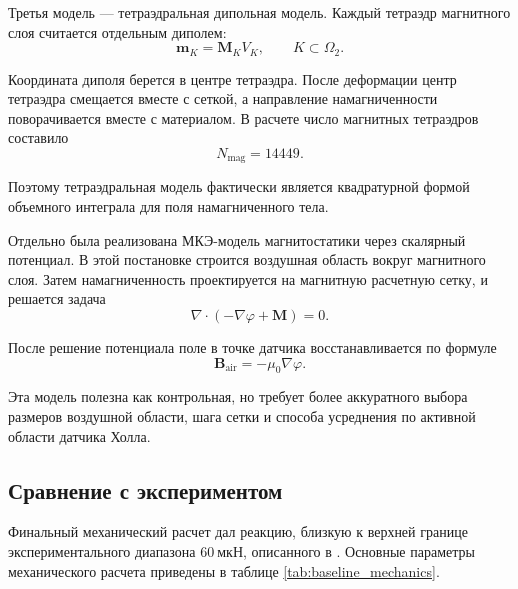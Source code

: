 \documentclass[14pt,a4paper]{extarticle}
\begin{document}
Третья модель --- тетраэдральная дипольная модель. Каждый тетраэдр магнитного слоя считается отдельным диполем:
\begin{equation}
    \mathbf{m}_K
    =
    \mathbf{M}_K V_K,
    \qquad
    K\subset\Omega_2.
\end{equation}

Координата диполя берется в центре тетраэдра. После деформации центр тетраэдра смещается вместе с сеткой, а направление намагниченности поворачивается вместе с материалом. В расчете число магнитных тетраэдров составило
\begin{equation}
    N_{\mathrm{mag}}=14449.
\end{equation}

Поэтому тетраэдральная модель фактически является квадратурной формой объемного интеграла для поля намагниченного тела.

Отдельно была реализована МКЭ-модель магнитостатики через скалярный потенциал. В этой постановке строится воздушная область вокруг магнитного слоя. Затем намагниченность проектируется на магнитную расчетную сетку, и решается задача
\begin{equation}
    \nabla\cdot(-\nabla\varphi+\mathbf{M})=0.
\end{equation}

После решение потенциала поле в точке датчика восстанавливается по формуле
\begin{equation}
    \mathbf{B}_{\mathrm{air}}
    =
    -\mu_0\nabla\varphi.
\end{equation}

Эта модель полезна как контрольная, но требует более аккуратного выбора размеров воздушной области, шага сетки и способа усреднения по активной области датчика Холла.


\subsection{Сравнение с экспериментом}

Финальный механический расчет дал реакцию, близкую к верхней границе экспериментального диапазона \(60~\text{мкН}\), описанного в \cite{man2023}. Основные параметры механического расчета приведены в таблице \ref{tab:baseline_mechanics}.
\end{document}

